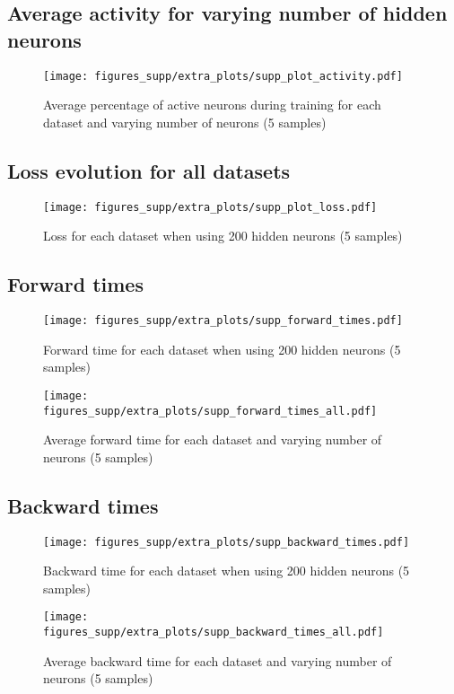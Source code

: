 \documentclass{article}
\begin{document}
\subsection{Average activity for varying number of hidden neurons}
\begin{figure}[!h]
\centering 
\texttt{[image: figures\_supp/extra\_plots/supp\_plot\_activity.pdf]}
\caption{Average percentage of active neurons during training for each dataset and varying number of neurons (5 samples)}
\end{figure}

\subsection{Loss evolution for all datasets}
\begin{figure}[!h]
\centering 
\texttt{[image: figures\_supp/extra\_plots/supp\_plot\_loss.pdf]}
\caption{Loss for each dataset when using 200 hidden neurons (5 samples)}
\end{figure}



\newpage
\subsection{Forward times}
\begin{figure}[!h]
\centering 
\texttt{[image: figures\_supp/extra\_plots/supp\_forward\_times.pdf]}
\caption{Forward time for each dataset when using 200 hidden neurons (5 samples)}
\end{figure}
\begin{figure}[!h]
\centering 
\texttt{[image: figures\_supp/extra\_plots/supp\_forward\_times\_all.pdf]}
\caption{Average forward time for each dataset and varying number of neurons (5 samples)}
\end{figure}

\subsection{Backward times}
\begin{figure}[!h]
\centering 
\texttt{[image: figures\_supp/extra\_plots/supp\_backward\_times.pdf]}
\caption{Backward time for each dataset when using 200 hidden neurons (5 samples)}
\end{figure}
\begin{figure}[!h]
\centering 
\texttt{[image: figures\_supp/extra\_plots/supp\_backward\_times\_all.pdf]}
\caption{Average backward time for each dataset and varying number of neurons (5 samples)}
\end{figure}
\end{document}
